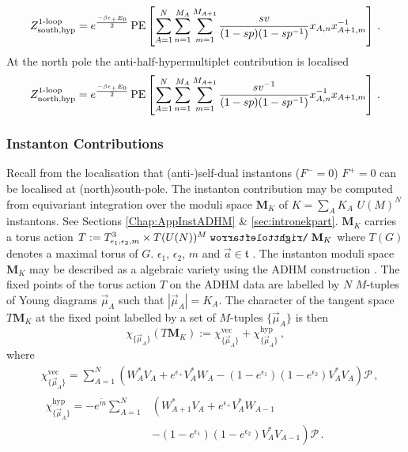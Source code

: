 \documentclass[main.tex]{subfiles}
\begin{document}
\begin{equation}\label{eqn:hyperpartsouth}
Z^{\text{1-loop}}_{\text{south},\text{hyp}}=e^{\frac{-\beta\epsilon_+E_0}{2}}\operatorname{\mathrm{PE}}\left[\sum_{A=1}^N\sum_{n=1}^{M_A}\sum_{m=1}^{M_{A+1}}\frac{sv}{(1-sp)(1-sp^{-1})}x_{A,n}x_{A+1,m}^{-1}\right]\,.
\end{equation}
At the north pole the anti-half-hypermultiplet contribution is localised
\begin{equation}\label{eqn:hyperpartnorth}
Z^{\text{1-loop}}_{\text{north},\text{hyp}}=e^{\frac{-\beta\epsilon_+E_0}{2}}\operatorname{\mathrm{PE}}\left[\sum_{A=1}^N\sum_{n=1}^{M_A}\sum_{m=1}^{M_{A+1}}\frac{sv^{-1}}{(1-sp)(1-sp^{-1})}x_{A,n}^{-1}x_{A+1,m}\right]\,.
\end{equation}

\subsubsection{Instanton Contributions}
Recall from the localisation that (anti-)self-dual instantons ($F^-=0$) $F^+=0$ can be localised at (north)south-pole.
The instanton contribution may be computed from equivariant integration over the moduli space $\mathbf{M}_K$ of $K=\sum_AK_A$ $U(M)^N$ instantons. See Sections \ref{Chap:AppInstADHM} \& \ref{sec:intronekpart}.
$\mathbf{M}_K$ carries a torus action $T:=T^3_{\epsilon_1,\epsilon_2,m}\times T(U(N))^M\acts \mathbf{M}_K$ where $T(G)$ denotes a maximal torus of $G$. $\epsilon_1$, $\epsilon_2$, $m$ and $\vec{a}\in\mathfrak{t}$ . 
The instanton moduli space $\mathbf{M}_K$ may be described as a algebraic variety using the ADHM construction \cite{Atiyah:1978ri}. The fixed points of the torus action $T$ on the ADHM data are labelled by $N$ $M$-tuples of Young diagrams $\vec{\mu}_A$ such that $|\vec{\mu}_A|=K_A$. 
The character of the tangent space $T\mathbf{M}_K$ at the fixed point labelled by a set of $M$-tuples $\{\vec{\mu}_A\}$ is then
\begin{equation}
\chi_{\{\vec{\mu}_A\}}\left(T\mathbf{M}_K\right):=\chi_{\{\vec{\mu}_A\}}^{\text{vec}}+\chi_{\{\vec{\mu}_A\}}^{\text{hyp}}\,,
\end{equation}
where
\begin{align}
&\chi_{\{\vec{\mu}_A\}}^{\text{vec}}=\sum_{A=1}^N\left(W_{A}^*V_A+e^{\epsilon_+}V_A^*W_A-(1-e^{\epsilon_1})(1-e^{\epsilon_2})V_A^*V_A\right)\mathcal{P}\,,\\
&\begin{aligned}
\chi_{\{\vec{\mu}_A\}}^{\text{hyp}}=-e^{\tilde{m}}\sum_{A=1}^N&\left(W_{A+1}^*V_A+e^{\epsilon_+}V_{A}^*W_{A-1}\right.\\
&\left.-(1-e^{\epsilon_1})(1-e^{\epsilon_2})V_A^*V_{A-1}\right)\mathcal{P}\,.
\end{aligned}
\end{align}
\end{document}

